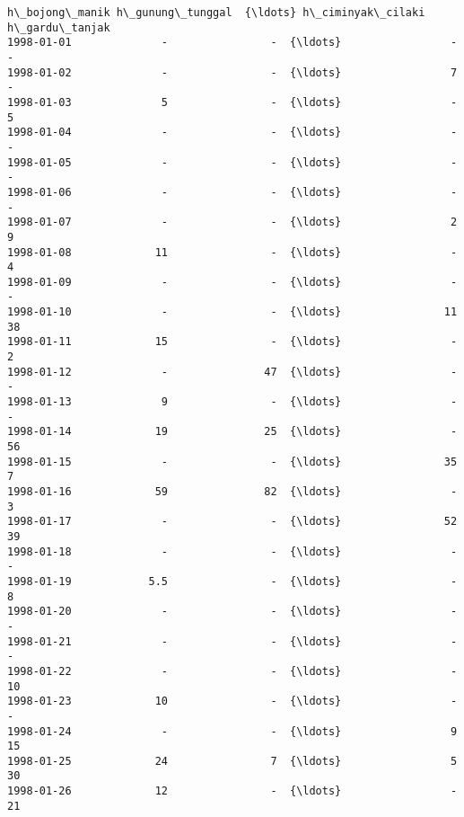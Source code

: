 \documentclass[11pt]{article}
\makeatletter
\newcommand{\boxspacing}{\kern\kvtcb@left@rule\kern\kvtcb@boxsep}
\newcommand{\prompt}[4]{
        {\ttfamily\llap{{\color{#2}[#3]:\hspace{3pt}#4}}\vspace{-\baselineskip}}
    }
\makeatother
\begin{document}
            \begin{tcolorbox}[breakable, size=fbox, boxrule=.5pt, pad at break*=1mm, opacityfill=0]
\prompt{Out}{outcolor}{ }{\boxspacing}
\begin{Verbatim}[commandchars=\\\{\}]
           h\_bojong\_manik h\_gunung\_tunggal  {\ldots} h\_ciminyak\_cilaki h\_gardu\_tanjak
1998-01-01              -                -  {\ldots}                 -              -
1998-01-02              -                -  {\ldots}                 7              -
1998-01-03              5                -  {\ldots}                 -              5
1998-01-04              -                -  {\ldots}                 -              -
1998-01-05              -                -  {\ldots}                 -              -
1998-01-06              -                -  {\ldots}                 -              -
1998-01-07              -                -  {\ldots}                 2              9
1998-01-08             11                -  {\ldots}                 -              4
1998-01-09              -                -  {\ldots}                 -              -
1998-01-10              -                -  {\ldots}                11             38
1998-01-11             15                -  {\ldots}                 -              2
1998-01-12              -               47  {\ldots}                 -              -
1998-01-13              9                -  {\ldots}                 -              -
1998-01-14             19               25  {\ldots}                 -             56
1998-01-15              -                -  {\ldots}                35              7
1998-01-16             59               82  {\ldots}                 -              3
1998-01-17              -                -  {\ldots}                52             39
1998-01-18              -                -  {\ldots}                 -              -
1998-01-19            5.5                -  {\ldots}                 -              8
1998-01-20              -                -  {\ldots}                 -              -
1998-01-21              -                -  {\ldots}                 -              -
1998-01-22              -                -  {\ldots}                 -             10
1998-01-23             10                -  {\ldots}                 -              -
1998-01-24              -                -  {\ldots}                 9             15
1998-01-25             24                7  {\ldots}                 5             30
1998-01-26             12                -  {\ldots}                 -             21

\end{Verbatim}
\end{tcolorbox}
\end{document}
